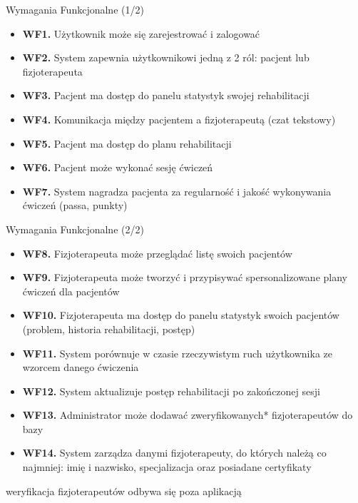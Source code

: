 \documentclass{beamer}
\begin{document}
\begin{frame}{Wymagania Funkcjonalne (1/2)}
    \footnotesize
    \begin{itemize}
        \item \textbf{WF1.} Użytkownik może się zarejestrować i zalogować
        \item \textbf{WF2.} System zapewnia użytkownikowi jedną z 2 ról: pacjent lub fizjoterapeuta
        \item \textbf{WF3.} Pacjent ma dostęp do panelu statystyk swojej rehabilitacji
        \item \textbf{WF4.} Komunikacja między pacjentem a fizjoterapeutą (czat tekstowy)
        \item \textbf{WF5.} Pacjent ma dostęp do planu rehabilitacji
        \item \textbf{WF6.} Pacjent może wykonać sesję ćwiczeń
        \item \textbf{WF7.} System nagradza pacjenta za regularność i jakość wykonywania ćwiczeń (passa, punkty)
    \end{itemize}
\end{frame}

\begin{frame}{Wymagania Funkcjonalne (2/2)}
    \footnotesize
    \begin{itemize}
        \item \textbf{WF8.} Fizjoterapeuta może przeglądać listę swoich pacjentów
        \item \textbf{WF9.} Fizjoterapeuta może tworzyć i przypisywać spersonalizowane plany ćwiczeń dla pacjentów
        \item \textbf{WF10.} Fizjoterapeuta ma dostęp do panelu statystyk swoich pacjentów (problem, historia rehabilitacji, postęp)
        \item \textbf{WF11.} System porównuje w czasie rzeczywistym ruch użytkownika ze wzorcem danego ćwiczenia
        \item \textbf{WF12.} System aktualizuje postęp rehabilitacji po zakończonej sesji
        \item \textbf{WF13.} Administrator może dodawać zweryfikowanych* fizjoterapeutów do bazy
        \item \textbf{WF14.} System zarządza danymi fizjoterapeuty, do których należą co najmniej: imię i nazwisko, specjalizacja oraz posiadane certyfikaty
    \end{itemize}
    \vspace{0.3cm}
    \scriptsize * weryfikacja fizjoterapeutów odbywa się poza aplikacją
\end{frame}
\end{document}

